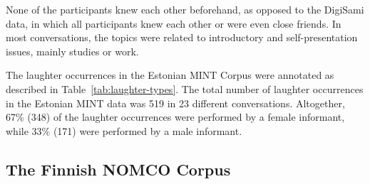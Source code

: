 None of the participants knew each other beforehand, as opposed to the DigiSami data, in which all participants knew each other or were even close friends. In most conversations, the topics were related to introductory and self-presentation issues, mainly studies or work.

The laughter occurrences in the Estonian MINT Corpus were annotated as described in Table~\ref{tab:laughter-types}. The total number of laughter occurrences in the Estonian MINT data was 519 in 23 different conversations.
Altogether, 67\% (348) of the laughter occurrences were performed by a female informant, while 33\% (171) were performed by a male informant.

\subsection{The Finnish NOMCO Corpus}
\label{sec:finnish-nomco-corpus}
